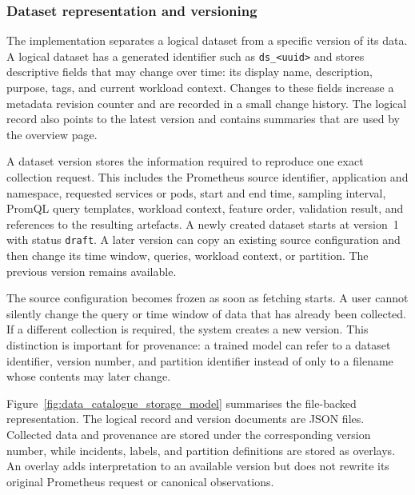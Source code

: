 \subsubsection{Dataset representation and versioning}

The implementation separates a logical dataset from a specific version of its data. A logical dataset has a generated identifier such as \texttt{ds\_<uuid>} and stores descriptive fields that may change over time: its display name, description, purpose, tags, and current workload context. Changes to these fields increase a metadata revision counter and are recorded in a small change history. The logical record also points to the latest version and contains summaries that are used by the overview page.

A dataset version stores the information required to reproduce one exact collection request. This includes the Prometheus source identifier, application and namespace, requested services or pods, start and end time, sampling interval, PromQL query templates, workload context, feature order, validation result, and references to the resulting artefacts. A newly created dataset starts at version~1 with status \texttt{draft}. A later version can copy an existing source configuration and then change its time window, queries, workload context, or partition. The previous version remains available.

The source configuration becomes frozen as soon as fetching starts. A user cannot silently change the query or time window of data that has already been collected. If a different collection is required, the system creates a new version. This distinction is important for provenance: a trained model can refer to a dataset identifier, version number, and partition identifier instead of only to a filename whose contents may later change.

Figure~\ref{fig:data_catalogue_storage_model} summarises the file-backed representation. The logical record and version documents are JSON files. Collected data and provenance are stored under the corresponding version number, while incidents, labels, and partition definitions are stored as overlays. An overlay adds interpretation to an available version but does not rewrite its original Prometheus request or canonical observations.

